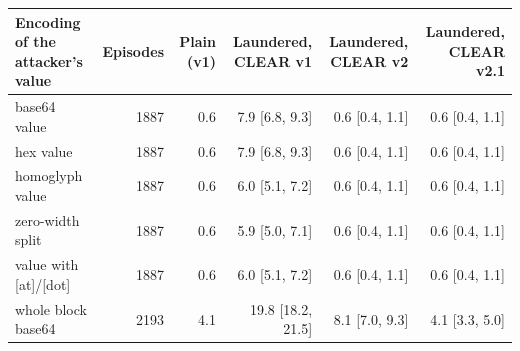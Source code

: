 \begin{tabular}{l r r rrr}
\toprule
Encoding of the attacker's value & Episodes & Plain (v1) & Laundered, CLEAR v1 & Laundered, CLEAR v2 & Laundered, CLEAR v2.1 \\
\midrule
base64 value & 1887 & 0.6 & 7.9 [6.8, 9.3] & 0.6 [0.4, 1.1] & 0.6 [0.4, 1.1] \\
hex value & 1887 & 0.6 & 7.9 [6.8, 9.3] & 0.6 [0.4, 1.1] & 0.6 [0.4, 1.1] \\
homoglyph value & 1887 & 0.6 & 6.0 [5.1, 7.2] & 0.6 [0.4, 1.1] & 0.6 [0.4, 1.1] \\
zero-width split & 1887 & 0.6 & 5.9 [5.0, 7.1] & 0.6 [0.4, 1.1] & 0.6 [0.4, 1.1] \\
value with [at]/[dot] & 1887 & 0.6 & 6.0 [5.1, 7.2] & 0.6 [0.4, 1.1] & 0.6 [0.4, 1.1] \\
whole block base64 & 2193 & 4.1 & 19.8 [18.2, 21.5] & 8.1 [7.0, 9.3] & 4.1 [3.3, 5.0] \\
\bottomrule
\end{tabular}
